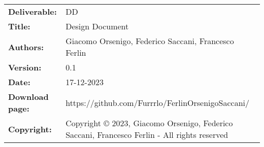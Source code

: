 \documentclass{config/PoliMi3i_thesis}
\begin{document}


\pagestyle{empty} %
\frontmatter %


\renewcommand{\headrulewidth}{0pt} %
\begin{table}[h!]
    \begin{tabu} to \textwidth { X[0.3,r,p] X[0.7,l,p] }
        \hline

        \textbf{Deliverable:}   & DD                                                                                           \\
        \textbf{Title:}         & Design Document                                                \\
        \textbf{Authors:}       & Giacomo Orsenigo, Federico Saccani, Francesco Ferlin                                           \\
        \textbf{Version:}       & 0.1                                                                                            \\
        \textbf{Date:}          & 17{-}12{-}2023                                                                                 \\
        \textbf{Download page:} & https://github.com/Furrrlo/FerlinOrsenigoSaccani/                                              \\
        \textbf{Copyright:}     & Copyright © 2023, Giacomo Orsenigo, Federico Saccani, Francesco Ferlin {-} All rights reserved \\
        \hline
    \end{tabu}
\end{table}
\end{document}
